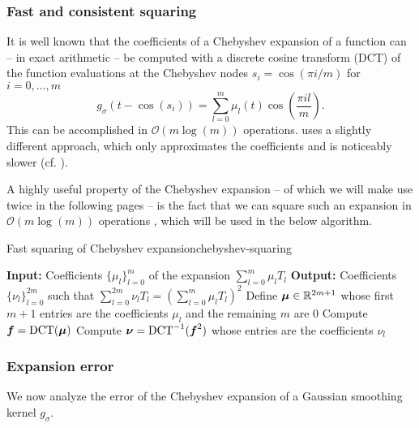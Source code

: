 \documentclass[12pt]{article}
\begin{document}
\subsubsection{Fast and consistent squaring}
\label{subsubsec:dct}

It is well known that the coefficients of a Chebyshev expansion of a function can -- in exact arithmetic -- be computed with a discrete cosine transform (DCT) of the function evaluations at the Chebyshev nodes $s_i = \cos(\pi i / m)$ for $i=0,\dots,m$
\begin{equation}
    g_{\sigma}(t - \cos(s_i)) = \sum_{l=0}^{m} \mu_l(t) \cos\left(\frac{\pi i l}{m} \right).
    \label{equ:discrete-cosine-transform}
\end{equation}
This can be accomplished in $\mathcal{O}(m \log(m))$ operations. \cite[algorithm 1]{lin-2017-randomized-estimation} uses a slightly different approach, which only approximates the coefficients and is noticeably slower (cf. ).

A highly useful property of the Chebyshev expansion -- of which we will make use twice in the following pages -- is the fact that we can square such an expansion in $\mathcal{O}(m \log(m))$ operations \cite{baszenski-1997-fast-polynomial}, which will be used in the below algorithm.

\begin{algo}{Fast squaring of Chebyshev expansion}{chebyshev-squaring}
    \begin{algorithmic}[1]
        \Statex \textbf{Input:} Coefficients $\{ \mu_l \}_{l=0}^{m}$ of the expansion $\sum_{l=0}^{m} \mu_l T_l$
        \Statex \textbf{Output:} Coefficients $\{ \nu_l \}_{l=0}^{2m}$ such that $\sum_{l=0}^{2m} \nu_l T_l = (\sum_{l=0}^{m} \mu_l T_l)^2$
        \State Define $\boldsymbol{\mu} \in \mathbb{R}^{2m + 1}$ whose first $m + 1$ entries are the coefficients $\mu_l$ and the remaining $m$ are $0$
    \State Compute $\boldsymbol{f} = \operatorname{DCT}(\boldsymbol{\mu})$
    \State Compute $\boldsymbol{\nu} = \operatorname{DCT}^{-1}(\boldsymbol{f}^{2})$ whose entries are the coefficients $\nu_l$
    \end{algorithmic}
    \end{algo}

\subsubsection{Expansion error}
\label{subsubsec:expansion-error}

We now analyze the error of the Chebyshev expansion of a Gaussian smoothing kernel $g_{\sigma}$.
\end{document}
